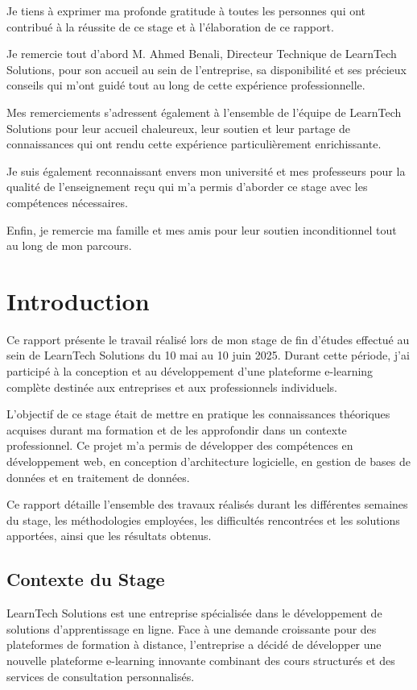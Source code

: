 \documentclass[12pt, a4paper]{report}
\begin{document}
Je tiens à exprimer ma profonde gratitude à toutes les personnes qui ont contribué à la réussite de ce stage et à l'élaboration de ce rapport.

Je remercie tout d'abord M. Ahmed Benali, Directeur Technique de LearnTech Solutions, pour son accueil au sein de l'entreprise, sa disponibilité et ses précieux conseils qui m'ont guidé tout au long de cette expérience professionnelle.

Mes remerciements s'adressent également à l'ensemble de l'équipe de LearnTech Solutions pour leur accueil chaleureux, leur soutien et leur partage de connaissances qui ont rendu cette expérience particulièrement enrichissante.

Je suis également reconnaissant envers mon université et mes professeurs pour la qualité de l'enseignement reçu qui m'a permis d'aborder ce stage avec les compétences nécessaires.

Enfin, je remercie ma famille et mes amis pour leur soutien inconditionnel tout au long de mon parcours.

\newpage

\tableofcontents
\thispagestyle{fancy}

\chapter{Introduction}
\thispagestyle{fancy}

Ce rapport présente le travail réalisé lors de mon stage de fin d'études effectué au sein de LearnTech Solutions du 10 mai au 10 juin 2025. Durant cette période, j'ai participé à la conception et au développement d'une plateforme e-learning complète destinée aux entreprises et aux professionnels individuels.

L'objectif de ce stage était de mettre en pratique les connaissances théoriques acquises durant ma formation et de les approfondir dans un contexte professionnel. Ce projet m'a permis de développer des compétences en développement web, en conception d'architecture logicielle, en gestion de bases de données et en traitement de données.

Ce rapport détaille l'ensemble des travaux réalisés durant les différentes semaines du stage, les méthodologies employées, les difficultés rencontrées et les solutions apportées, ainsi que les résultats obtenus.

\section{Contexte du Stage}
LearnTech Solutions est une entreprise spécialisée dans le développement de solutions d'apprentissage en ligne. Face à une demande croissante pour des plateformes de formation à distance, l'entreprise a décidé de développer une nouvelle plateforme e-learning innovante combinant des cours structurés et des services de consultation personnalisés.
\end{document}
